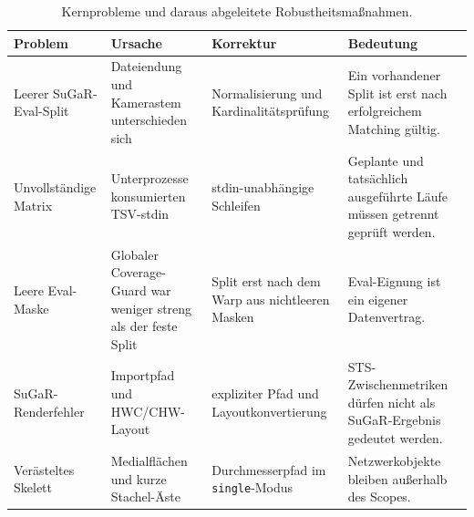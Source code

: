 \begin{table}[H]
\centering
\small
\begin{tabularx}{\textwidth}{p{2.5cm}XXX}
\toprule
Problem & Ursache & Korrektur & Bedeutung\\
\midrule
Leerer SuGaR-Eval-Split & Dateiendung und Kamerastem unterschieden sich &
Normalisierung und Kardinalitätsprüfung & Ein vorhandener Split ist erst nach
erfolgreichem Matching gültig.\\
Unvollständige Matrix & Unterprozesse konsumierten TSV-stdin &
stdin-unabhängige Schleifen & Geplante und tatsächlich ausgeführte Läufe müssen
getrennt geprüft werden.\\
Leere Eval-Maske & Globaler Coverage-Guard war weniger streng als der feste
Split & Split erst nach dem Warp aus nichtleeren Masken & Eval-Eignung ist ein
eigener Datenvertrag.\\
SuGaR-Renderfehler & Importpfad und HWC/CHW-Layout & expliziter Pfad und
Layoutkonvertierung & STS-Zwischenmetriken dürfen nicht als SuGaR-Ergebnis
gedeutet werden.\\
Verästeltes Skelett & Medialflächen und kurze Stachel-Äste & Durchmesserpfad im
\texttt{single}-Modus & Netzwerkobjekte bleiben außerhalb des Scopes.\\
\bottomrule
\end{tabularx}
\caption{Kernprobleme und daraus abgeleitete Robustheitsmaßnahmen.}
\label{tab:robustheit-kern}
\end{table}
